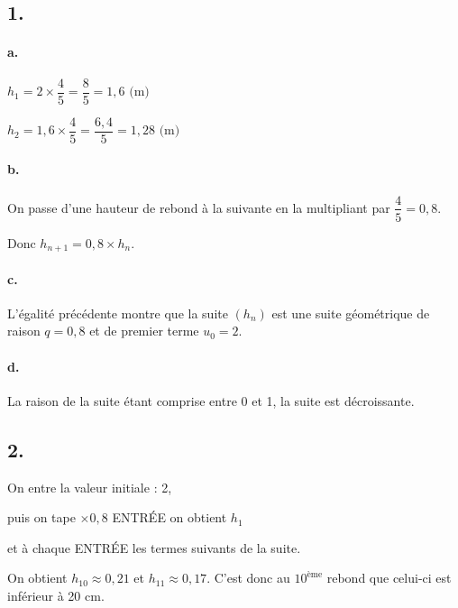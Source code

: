 \subsection*{1.}

\paragraph{a.} 
\(h_1 = 2 \times \dfrac{4}{5} = \dfrac{8}{5} = 1{,}6 \text{ (m)}\)

\(h_2 = 1{,}6 \times \dfrac{4}{5} = \dfrac{6,4}{5} = 1{,}28 \text{ (m)}\)

\paragraph{b.} On passe d'une hauteur de rebond à la suivante en la multipliant par \(\dfrac{4}{5} = 0{,}8\).

Donc \(h_{n+1} = 0{,}8 \times h_n\).

\paragraph{c.} L'égalité précédente montre que la suite \((h_n)\) est une suite géométrique de raison \(q = 0{,}8\) et de premier terme \(u_0 = 2\).

\paragraph{d.} La raison de la suite étant comprise entre 0 et 1, la suite est décroissante.

\subsection*{2.}

On entre la valeur initiale : 2,

puis on tape \(\times 0{,}8\) ENTRÉE on obtient \(h_1\)

et à chaque ENTRÉE les termes suivants de la suite.

On obtient \(h_{10} \approx 0{,}21\) et \(h_{11} \approx 0{,}17\). C'est donc au \(10^{\text{ème}}\) rebond que celui-ci est inférieur à 20 cm.
